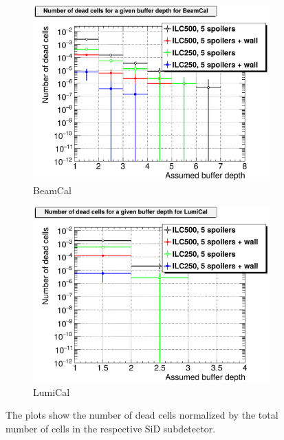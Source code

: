 \begin{figure}[htb]
\begin{subfigure}[b]{0.49\textwidth}
    \includegraphics[width=\textwidth]{Figures/BDS_muons/Occupancy_Comparison_All_layers_deadcells_BeamCal.png}
   \caption{\sid BeamCal}
   \end{subfigure}
   \hfill
    \begin{subfigure}[b]{0.49\textwidth}
   \centering
    \includegraphics[width=\textwidth]{Figures/BDS_muons/Occupancy_Comparison_All_layers_deadcells_LumiCal.png}
   \caption{\sid LumiCal}
   \end{subfigure}
   \caption[Occupancy from BDS muons of various SiD subdetectors]{The plots show the number of dead cells normalized by the total number of cells in the respective SiD subdetector.}
   \label{fig:BDS_Muons:occupancies}
 \end{figure}
 
